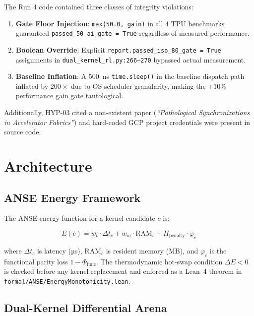 \documentclass[10pt,twocolumn]{article}
\begin{document}
The Run 4 code contained three classes of integrity violations:
\begin{enumerate}
  \item \textbf{Gate Floor Injection}: \texttt{max(50.0, gain)} in all 4 TPU benchmarks
        guaranteed \texttt{passed\_50\_ai\_gate = True} regardless of measured performance.
  \item \textbf{Boolean Override}: Explicit \texttt{report.passed\_iso\_80\_gate = True}
        assignments in \texttt{dual\_kernel\_rl.py:266--270} bypassed actual measurement.
  \item \textbf{Baseline Inflation}: A 500~ns \texttt{time.sleep()} in the baseline
        dispatch path inflated by $200\times$ due to OS scheduler granularity,
        making the $+10\%$ performance gain gate tautological.
\end{enumerate}

Additionally, HYP-03 cited a non-existent paper
(\emph{``Pathological Synchronizations in Accelerator Fabrics''}) and hard-coded
GCP project credentials were present in source code.

\section{Architecture}

\subsection{ANSE Energy Framework}

The ANSE energy function for a kernel candidate $c$ is:

\begin{equation}
  E(c) = w_t \cdot \Delta t_c + w_m \cdot \text{RAM}_c + \Pi_{\text{penalty}} \cdot \varphi_c
\end{equation}

where $\Delta t_c$ is latency (µs), $\text{RAM}_c$ is resident memory (MB), and
$\varphi_c$ is the functional parity loss $1 - \Phi_{\text{func}}$.
The thermodynamic hot-swap condition $\Delta E < 0$ is checked before any kernel replacement
and enforced as a Lean~4 theorem in \texttt{formal/ANSE/EnergyMonotonicity.lean}.

\subsection{Dual-Kernel Differential Arena}
\end{document}
